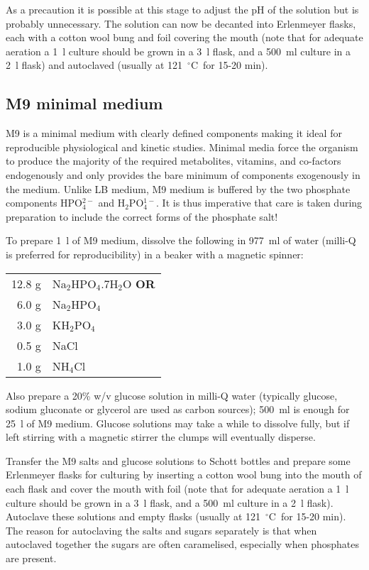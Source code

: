 \documentclass[a4paper]{article}
\newcommand{\dc}{~$^{\circ}$C}
\begin{document}
\begin{multicols}{2}
As a precaution it is possible at this stage to adjust the pH of the solution
but is probably unnecessary. The solution can now be decanted into Erlenmeyer
flasks, each with a cotton wool bung and foil covering the mouth (note that for
adequate aeration a 1~l culture should be grown in a 3~l flask, and
a 500~ml culture in a 2~l flask) and autoclaved (usually at 121\dc\ for 15-20
min).

\subsection{M9 minimal medium}

M9 is a minimal medium with clearly defined components making it ideal for
reproducible physiological and kinetic studies. Minimal media force the
organism to produce the majority of the required metabolites, vitamins,
and co-factors endogenously and only provides the bare minimum of components
exogenously in the medium. Unlike LB medium, M9 medium is buffered by the two
phosphate components HPO$_4^{2-}$ and H$_2$PO$_4^{1-}$. It is thus imperative
that care is taken during preparation to include the correct forms of the
phosphate salt!

To prepare 1~l of M9 medium, dissolve the following in 977~ml of water (milli-Q is
preferred for reproducibility) in a beaker with a magnetic spinner:

\begin{center}
\begin{tabular}[h]{rl} \toprule
12.8 g  & Na$_2$HPO$_4$.7H$_2$O \textbf{OR}\\
6.0 g  & Na$_2$HPO$_4$\\\midrule
3.0 g  & KH$_2$PO$_4$\\
0.5 g   & NaCl\\
1.0 g   & NH$_4$Cl\\ \bottomrule
\end{tabular}
\end{center}

Also prepare a 20\% w/v glucose solution in milli-Q water (typically glucose,
sodium gluconate or glycerol are used as carbon sources); 500~ml is enough for
25~l of M9 medium.  Glucose solutions may take a while to dissolve fully, but
if left stirring with a magnetic stirrer the clumps will eventually disperse.

Transfer the M9 salts and glucose solutions to Schott bottles and prepare some
Erlenmeyer flasks for culturing by inserting a cotton wool bung into the mouth
of each flask and cover the mouth with foil (note that for adequate aeration a
1~l culture should be grown in a 3~l flask, and a 500~ml culture in a 2~l
flask). Autoclave these solutions and empty flasks (usually at 121\dc\ for
15-20 min).  The reason for autoclaving the salts and sugars separately is that
when autoclaved together the sugars are often caramelised, especially when
phosphates are present.


\end{multicols}
\end{document}
